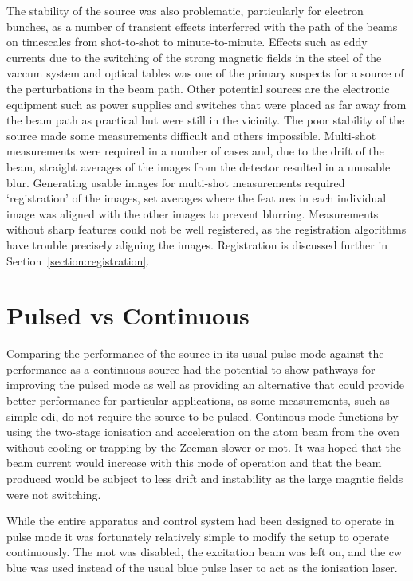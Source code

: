 The stability of the source was also problematic, particularly for electron bunches, as a number of transient effects interferred with the path of the beams on timescales from shot-to-shot to minute-to-minute.
Effects such as eddy currents due to the switching of the strong magnetic fields in the steel of the vaccum system and optical tables was one of the primary suspects for a source of the perturbations in the beam path.
Other potential sources are the electronic equipment such as power supplies and switches that were placed as far away from the beam path as practical but were still in the vicinity.
The poor stability of the source made some measurements difficult and others impossible.
Multi-shot measurements were required in a number of cases and, due to the drift of the beam, straight averages of the images from the detector resulted in a unusable blur.
Generating usable images for multi-shot measurements required `registration' of the images, set averages where the features in each individual image was aligned with the other images to prevent blurring.
Measurements without sharp features could not be well registered, as the registration algorithms have trouble precisely aligning the images.
Registration is discussed further in Section~\ref{section:registration}.

\section{Pulsed vs Continuous}\label{section:pulse_vs_continuous}
Comparing the performance of the source in its usual pulse mode against the performance as a continuous source had the potential to show pathways for improving the pulsed mode as well as providing an alternative that could provide better performance for particular applications, as some measurements, such as simple \gls{cdi}, do not require the source to be pulsed.
Continous mode functions by using the two-stage ionisation and acceleration on the atom beam from the oven without cooling or trapping by the Zeeman slower or \gls{mot}.
It was hoped that the beam current would increase with this mode of operation and that the beam produced would be subject to less drift and instability as the large magntic fields were not switching.

While the entire apparatus and control system had been designed to operate in pulse mode it was fortunately relatively simple to modify the setup to operate continuously.
The \gls{mot} was disabled, the excitation beam was left on, and the \gls{cw} blue was used instead of the usual blue pulse laser to act as the ionisation laser.

